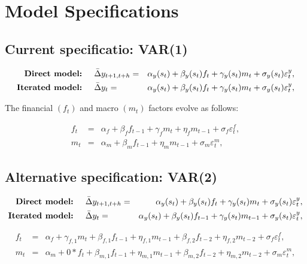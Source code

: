 \documentclass[12pt]{article}
\numberwithin{table}{subsection}
\numberwithin{figure}{section}
\begin{document}
\section{Model Specifications}
\subsection{Current specificatio: VAR(1)}
\begin{eqnarray}
	\mbox{\textbf{Direct model:}
	} \quad & {\bar{\Delta} {y}_{t+1,t+h}} =& {\alpha_y} ({s_t}) + {\beta_y} ({s_t}) {f_t} + {\gamma_y} ({s_t}) m_t + {\sigma_y} ({s_t}) \varepsilon^y_t, \label{eq:MS_direct} \\
	\mbox{\textbf{Iterated model:}
	} \quad & {\bar{\Delta} {y}_{t}} =& {\alpha_y} ({s_t}) + {\beta_y} ({s_t}) {f_t} + {\gamma_y} ({s_t}) m_t + {\sigma_y} ({s_t}) \varepsilon^y_t, \label{eq:MS_direct}
\end{eqnarray}

The financial $(f_t)$ and macro $(m_t)$ factors evolve as follows:

\begin{eqnarray}
		f_t &=& \alpha_f + \beta_f f_{t-1} + \gamma_f m_t + \eta_{f} m_{t-1} + \sigma_f \varepsilon^f_t, \label{eq:MS_f} \\
		m_t &=&  \alpha_m  +\beta_{m} f_{t-1} + \eta_m m_{t-1} + \sigma_m \varepsilon^m_t, \label{eq:MS_m}
\end{eqnarray}

\subsection{Alternative specification: VAR(2)}
\begin{eqnarray}
	\mbox{\textbf{Direct model:}
	} \quad & {\bar{\Delta} {y}_{t+1,t+h}} =& {\alpha_y} ({s_t}) + {\beta_y} ({s_t}) {f_t} + {\gamma_y} ({s_t}) m_t + {\sigma_y} ({s_t}) \varepsilon^y_t, \label{eq:MS_direct} \\
	\mbox{\textbf{Iterated model:}
	} \quad & {\bar{\Delta} {y}_{t}} =& {\alpha_y} ({s_t}) + {\beta_y} ({s_t}) f_{t-1} + {\gamma_y} ({s_t}) m_{t-1} + {\sigma_y} ({s_t}) \varepsilon^y_t, \label{eq:MS_direct}
\end{eqnarray}


\begin{eqnarray}
	f_t &=& \alpha_f  + \gamma_{f,1} m_t + \beta_{f,1} f_{t-1} + \eta_{f,1} m_{t-1} + \beta_{f,2} f_{t-2} + \eta_{f,2} m_{t-2} + \sigma_f \varepsilon^f_t, \label{eq:MS_f} \\
	m_t &=&  \alpha_m + 0 * f_t          + \beta_{m,1} f_{t-1} + \eta_{m,1} m_{t-1} + \beta_{m,2} f_{t-2} + \eta_{m,2} m_{t-2}+ \sigma_m \varepsilon^m_t, \label{eq:MS_m}
\end{eqnarray}
\end{document}
